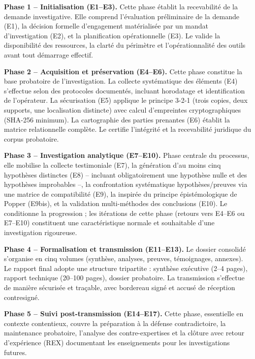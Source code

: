 \documentclass[12pt, a4paper]{report}
\begin{document}
	\vspace{0.3cm}
	
	\textbf{Phase 1 -- Initialisation (E1--E3).}
	Cette phase établit la recevabilité de la demande investigative. Elle
	comprend l'évaluation préliminaire de la demande (E1), la décision
	formelle d'engagement matérialisée par un mandat d'investigation (E2),
	et la planification opérationnelle (E3). Le 
	valide la disponibilité des ressources, la clarté du périmètre et
	l'opérationnalité des outils avant tout démarrage effectif.
	
	\vspace{0.25cm}
	
	\textbf{Phase 2 -- Acquisition et préservation (E4--E6).}
	Cette phase constitue la base probatoire de l'investigation. La collecte
	systématique des éléments (E4) s'effectue selon des protocoles documentés,
	incluant horodatage et identification de l'opérateur. La sécurisation (E5)
	applique le principe 3-2-1 (trois copies, deux supports, une localisation
	distincte) avec calcul d'empreintes cryptographiques (SHA-256 minimum).
	La cartographie des parties prenantes (E6) établit la matrice
	relationnelle complète. Le  certifie l'intégrité
	et la recevabilité juridique du corpus probatoire.
	
	\vspace{0.25cm}
	
	\textbf{Phase 3 -- Investigation analytique (E7--E10).}
	Phase centrale du processus, elle mobilise la collecte testimoniale (E7),
	la génération d'au moins cinq hypothèses distinctes (E8) -- incluant
	obligatoirement une hypothèse nulle et des hypothèses improbables --,
	la confrontation systématique hypothèses/preuves via une matrice de
	compatibilité (E9), la  inspirée du
	principe épistémologique de Popper (E9bis), et la validation
	multi-méthodes des conclusions (E10). Le 
	conditionne la progression ; les itérations de cette phase (retours
	vers E4--E6 ou E7--E10) constituent une caractéristique normale et
	souhaitable d'une investigation rigoureuse.
	
	\vspace{0.25cm}
	
	\textbf{Phase 4 -- Formalisation et transmission (E11--E13).}
	Le dossier consolidé s'organise en cinq volumes (synthèse, analyses,
	preuves, témoignages, annexes). Le rapport final adopte une structure
	tripartite : synthèse exécutive (2--4 pages), rapport technique
	(20--100 pages), dossier probatoire. La transmission s'effectue de
	manière sécurisée et traçable, avec bordereau signé et accusé de
	réception contresigné.
	
	\vspace{0.25cm}
	
	\textbf{Phase 5 -- Suivi post-transmission (E14--E17).}
	Cette phase, essentielle en contexte contentieux, couvre la préparation
	à la défense contradictoire, la maintenance probatoire, l'analyse des
	contre-expertises et la clôture avec retour d'expérience (REX)
	documentant les enseignements pour les investigations futures.
	
	
	
\end{document}
